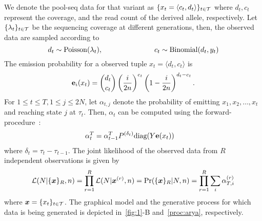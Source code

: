 
We denote the pool-seq data for that variant as $\{x_t = \langle
c_t,d_t \rangle\}_{t\in{\cal T}}$ where $d_t, c_t$ represent the coverage, and the 
read count of the derived allele, respectively. Let $\{\lambda_t\}_{t\in{\cal T}}$ be 
the sequencing coverage at
different generations, then, the observed data are sampled according
to 
\begin{equation} d_t \sim \operatorname{Poisson}(\lambda_t), \hspace{1in} c_t \sim
\operatorname{Binomial}(d_t,y_t) 
\end{equation}
The emission probability for a observed tuple $x_t=\langle d_t,
c_t\rangle $ is 
\begin{equation} {\bf e}_{i}(x_t) = {d_t \choose c_t}
\left(\frac{i}{2n} \right)^{c_t}\left (1- \frac{i}{2n}
\right)^{d_t-c_t} .  
\end{equation}
For $1\le t\le T, 1\le j\le 2N$, let $\alpha_{t,j}$ denote the
probability of emitting $x_1,x_2,\ldots,x_t$ and reaching state $j$ at
$\tau_t$. Then, $\alpha_{t}$ can be computed using the
forward-procedure~\cite{durbin1998biological}:
\begin{align}
	\alpha_t^T&=\alpha_{t-1}^T P^{(\delta_t)}\text{diag}(Y{\mathbf e}(x_t))
	\label{eq:hmm}
\end{align}
where $\delta_t=\tau_t-\tau_{t-1}$. The joint likelihood of the
observed data from $R$ independent observations is given by
\begin{equation}
{\cal L}(N|\{\bm{x}\}_R, 
n)=\prod_{r=1}^R{\cal L}(N|\bm{x}^{(r)},n)=\operatorname{Pr}(\{\bm{x}\}_R|N,n) =	
	\prod_{r=1}^R \sum_i\alpha_{T,i}^{(r)}
	\label{eq:hmmlik}
\end{equation}
where $\bm{x}=\{x_t\}_{t\in {\cal T}}$. The graphical model and the generative 
process for which data is being generated is depicted in~\ref{fig:1}-B 
and~\ref{proc:arya}, respectively.


